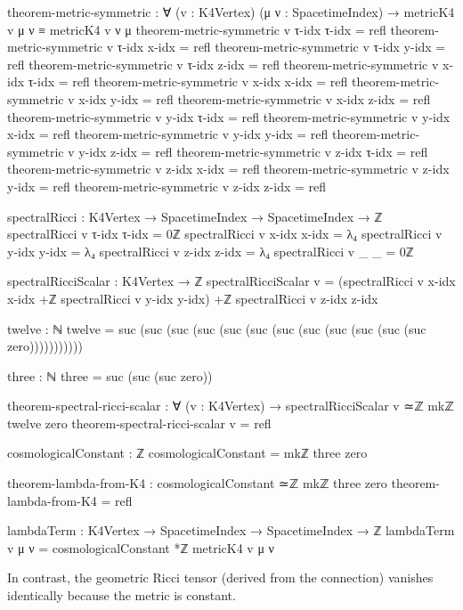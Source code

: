\documentclass[11pt,a4paper]{book}
\begin{document}
\begin{code}
theorem-metric-symmetric : ∀ (v : K4Vertex) (μ ν : SpacetimeIndex) → 
                           metricK4 v μ ν ≡ metricK4 v ν μ
theorem-metric-symmetric v τ-idx τ-idx = refl
theorem-metric-symmetric v τ-idx x-idx = refl
theorem-metric-symmetric v τ-idx y-idx = refl
theorem-metric-symmetric v τ-idx z-idx = refl
theorem-metric-symmetric v x-idx τ-idx = refl
theorem-metric-symmetric v x-idx x-idx = refl
theorem-metric-symmetric v x-idx y-idx = refl
theorem-metric-symmetric v x-idx z-idx = refl
theorem-metric-symmetric v y-idx τ-idx = refl
theorem-metric-symmetric v y-idx x-idx = refl
theorem-metric-symmetric v y-idx y-idx = refl
theorem-metric-symmetric v y-idx z-idx = refl
theorem-metric-symmetric v z-idx τ-idx = refl
theorem-metric-symmetric v z-idx x-idx = refl
theorem-metric-symmetric v z-idx y-idx = refl
theorem-metric-symmetric v z-idx z-idx = refl

spectralRicci : K4Vertex → SpacetimeIndex → SpacetimeIndex → ℤ
spectralRicci v τ-idx τ-idx = 0ℤ
spectralRicci v x-idx x-idx = λ₄
spectralRicci v y-idx y-idx = λ₄
spectralRicci v z-idx z-idx = λ₄
spectralRicci v _     _     = 0ℤ

spectralRicciScalar : K4Vertex → ℤ
spectralRicciScalar v = (spectralRicci v x-idx x-idx +ℤ
                         spectralRicci v y-idx y-idx) +ℤ
                         spectralRicci v z-idx z-idx

twelve : ℕ
twelve = suc (suc (suc (suc (suc (suc (suc (suc (suc (suc (suc (suc zero)))))))))))

three : ℕ
three = suc (suc (suc zero))

theorem-spectral-ricci-scalar : ∀ (v : K4Vertex) → 
  spectralRicciScalar v ≃ℤ mkℤ twelve zero
theorem-spectral-ricci-scalar v = refl

cosmologicalConstant : ℤ
cosmologicalConstant = mkℤ three zero

theorem-lambda-from-K4 : cosmologicalConstant ≃ℤ mkℤ three zero
theorem-lambda-from-K4 = refl

lambdaTerm : K4Vertex → SpacetimeIndex → SpacetimeIndex → ℤ
lambdaTerm v μ ν = cosmologicalConstant *ℤ metricK4 v μ ν
\end{code}

In contrast, the geometric Ricci tensor (derived from the connection) vanishes identically because the metric is constant.
\end{document}
